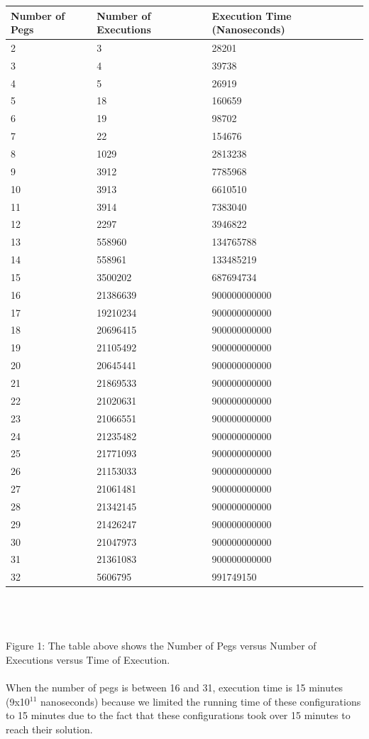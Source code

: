 \documentclass{article}
\begin{document}
\newpage
\begin{tabular}{|l|l|p{7cm}|}
\hline
Number of Pegs & Number of Executions & Execution Time (Nanoseconds) \\
\hline
2&	3&	28201\\
3&	4&	39738\\
4&	5&	26919\\
5&	18&	160659\\
6&	19&	98702\\
7&	22&	154676\\
8&	1029&	2813238\\
9	&3912&	7785968\\
10	&3913&	6610510\\
11	&3914&	7383040\\
12	&2297&	3946822\\
13	&558960&	134765788\\
14	&558961&	133485219\\
15	&3500202&	687694734\\
16	&21386639&	900000000000\\
17	&19210234&	900000000000\\
18	&20696415&	900000000000\\
19	&21105492&	900000000000\\
20	&20645441&	900000000000\\
21	&21869533&	900000000000\\
22	&21020631&	900000000000\\
23	&21066551&	900000000000\\
24	&21235482&	900000000000\\
25	&21771093&	900000000000\\
26	&21153033&	900000000000\\
27	&21061481&	900000000000\\
28	&21342145&	900000000000\\
29	&21426247&	900000000000\\
30	&21047973&	900000000000\\
31	&21361083&	900000000000\\
32	&5606795&	991749150\\
\hline
\end{tabular}\\\\
\\Figure 1: The table above shows the Number of Pegs versus Number of Executions versus Time of Execution.\\
\\When the number of pegs is between 16 and 31, execution time is 15 minutes (9x10$^{11}$ nanoseconds) because we limited the running time of these configurations to 15 minutes due to the fact that these configurations took over 15 minutes to reach their solution.
\newpage
\end{document}
